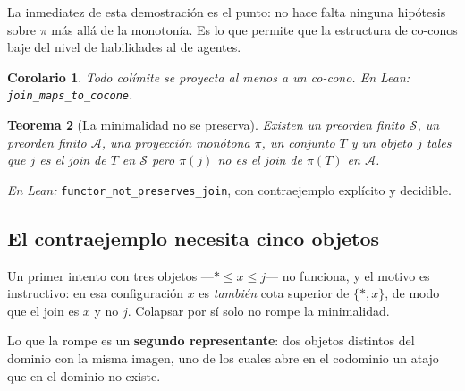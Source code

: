 \documentclass[11pt,a4paper]{article}
\theoremstyle{plain}
\newtheorem{teorema}{Teorema}[section]
\newtheorem{corolario}[teorema]{Corolario}
\theoremstyle{definition}
\theoremstyle{remark}
\newcommand{\Skills}{\mathcal{S}}
\newcommand{\Agentes}{\mathcal{A}}
\newcommand{\base}{\ast}
\begin{document}
La inmediatez de esta demostración es el punto: no hace falta ninguna hipótesis
sobre $\pi$ más allá de la monotonía. Es lo que permite que la estructura de
co-conos baje del nivel de habilidades al de agentes.

\begin{corolario}
Todo colímite se proyecta al menos a un co-cono.
\emph{En Lean:} \texttt{join\_maps\_to\_cocone}.
\end{corolario}

\begin{teorema}[La minimalidad no se preserva]
\label{thm:nomin}
Existen un preorden finito $\Skills$, un preorden finito $\Agentes$, una
proyección monótona $\pi$, un conjunto $T$ y un objeto $j$ tales que $j$ es el
join de $T$ en $\Skills$ pero $\pi(j)$ no es el join de $\pi(T)$ en $\Agentes$.
\end{teorema}

\noindent\emph{En Lean:} \texttt{functor\_not\_preserves\_join}, con
contraejemplo explícito y decidible.

\subsection{El contraejemplo necesita cinco objetos}

Un primer intento con tres objetos —$\base \le x \le j$— no funciona, y el
motivo es instructivo: en esa configuración $x$ es \emph{también} cota superior
de $\{\base,x\}$, de modo que el join es $x$ y no $j$. Colapsar por sí solo no
rompe la minimalidad.

Lo que la rompe es un \textbf{segundo representante}: dos objetos distintos del
dominio con la misma imagen, uno de los cuales abre en el codominio un atajo que
en el dominio no existe.

\begin{center}
\end{center}
\end{document}
